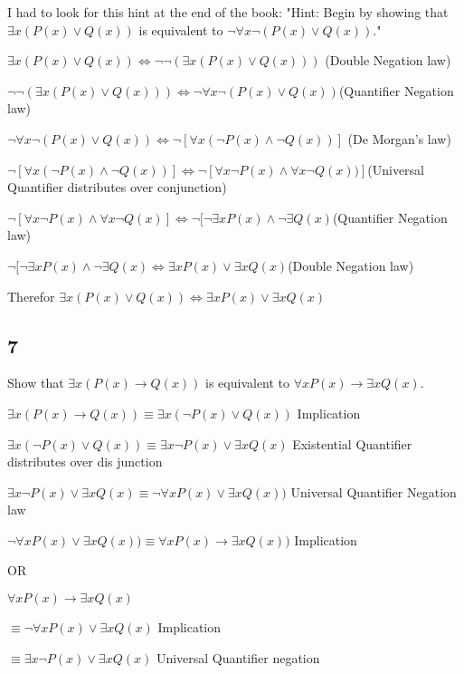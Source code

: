 \documentclass{article}
\begin{document}
I had to look for this hint at the end of the book: "Hint: Begin by showing that $\exists x(P(x) \lor Q(x))$ is equivalent to
$\neg \forall x\neg (P(x) \lor Q(x)).$"

$\exists x(P(x) \lor Q(x)) \Leftrightarrow \neg \neg (\exists x(P(x) \lor Q(x)))$ (Double Negation law)

$\neg \neg (\exists x(P(x) \lor Q(x))) \Leftrightarrow \neg \forall x \neg (P(x) \lor Q(x))$(Quantifier Negation law)

$\neg \forall x\neg (P(x) \lor Q(x)) \Leftrightarrow \neg [\forall x (\neg P(x) \land \neg Q(x))]$ (De Morgan's law)

$\neg[ \forall x (\neg P(x) \land \neg Q(x)) ]\Leftrightarrow \neg[ \forall x \neg P(x) \land \forall x\neg Q(x))]$(Universal Quantifier distributes over conjunction)

$\neg [\forall x \neg P(x) \land \forall x\neg Q(x) ]\Leftrightarrow \neg[ \neg \exists x P(x) \land \neg \exists Q(x)$(Quantifier Negation law)

$\neg[ \neg \exists x P(x) \land \neg \exists Q(x) \Leftrightarrow \exists xP(x) \lor \exists xQ(x) $(Double Negation law)


Therefor $\exists x(P(x) \lor Q(x)) \Leftrightarrow \exists xP(x) \lor \exists xQ(x)$
\newpage
\subsection{7}
Show that $\exists x (P(x) \rightarrow Q(x))$ is equivalent to $\forall xP(x) \rightarrow \exists xQ(x)$.

$\exists x(P(x) \rightarrow Q(x)) \equiv \exists x (\neg P(x) \lor Q(x))$  Implication

$\exists x(\neg P(x) \lor Q(x)) \equiv \exists x \neg P(x) \lor \exists x Q(x)$ Existential Quantifier distributes over dis junction

$\exists x\neg P(x) \lor \exists x Q(x) \equiv \neg \forall x P(x) \lor \exists x Q(x))$  Universal Quantifier Negation law

$\neg \forall x P(x) \lor \exists x Q(x)) \equiv \forall x P(x) \rightarrow \exists x Q(x))$ Implication

OR 

$\forall x P(x) \rightarrow \exists x Q(x)$

$\equiv \neg \forall x P(x) \lor \exists x Q(x)$ Implication

$\equiv \exists x \neg P(x) \lor \exists x Q(x)$ Universal Quantifier negation
\end{document}
